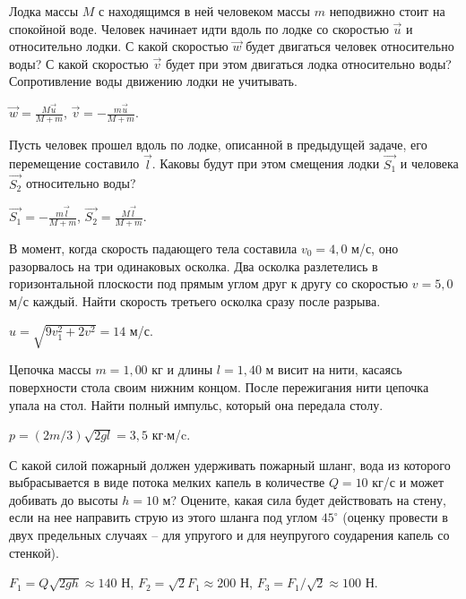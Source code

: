 \begin{ex} %
Лодка массы $M$ с находящимся в ней человеком массы $m$ неподвижно стоит на спокойной воде. Человек начинает идти вдоль по лодке со скоростью $\vec{u}$ и относительно лодки. С какой скоростью $\vec{w}$ будет двигаться человек относительно воды? С какой скоростью $\vec{v}$ будет при этом двигаться лодка относительно воды? Сопротивление воды движению лодки не учитывать.
\begin{ans}
$\vec{w} = \frac{M\vec{u}}{M+m}$, $\vec{v} = -\frac{m\vec{u}}{M+m}$.
\end{ans}
\end{ex}

\begin{ex} %
Пусть человек прошел вдоль по лодке, описанной в предыдущей задаче, его перемещение составило $\vec{l}$. Каковы будут при этом смещения лодки $\vec{S_1}$ и человека $\vec{S_2}$ относительно воды?
\begin{ans}
$\vec{S_1} = -\frac{m\vec{l}}{M+m}$, $\vec{S_2} = \frac{M\vec{l}}{M+m}$.
\end{ans}
\end{ex}

\complexProblems

\begin{ex} %
В момент, когда скорость падающего тела составила $v_0 = 4,0$ м/с, оно разорвалось на три одинаковых осколка. Два осколка разлетелись в горизонтальной плоскости под прямым углом друг к другу со скоростью $v = 5,0$ м/с каждый. Найти скорость третьего осколка сразу после разрыва.
\begin{ans}
$u = \sqrt{9v_{1}^2 + 2v^2} = 14$ м/с.
\end{ans}
\end{ex}

\begin{ex} %
Цепочка массы $m = 1,00$ кг и длины $l = 1,40$ м висит на нити, касаясь поверхности стола своим нижним концом. После пережигания нити цепочка упала на стол. Найти полный импульс, который она передала столу.
\begin{ans}
$p = (2m/3)\sqrt{2gl} = 3,5$ кг$\cdot$м/c.
\end{ans}
\end{ex}

\begin{ex} %
С какой силой пожарный должен удерживать пожарный шланг, вода из которого выбрасывается в виде потока мелких капель в количестве $Q = 10$ кг/с и может добивать до высоты $h = 10$ м? Оцените, какая сила будет действовать на стену, если на нее направить струю из этого шланга под углом $45^{\circ}$ (оценку провести в двух предельных случаях -- для упругого и для неупругого соударения капель со стенкой).
\begin{ans}
$F_1 = Q\sqrt{2gh} \approx 140$ Н, $F_2 = \sqrt{2} F_1 \approx 200$ Н, $F_3 = F_1/\sqrt{2} \approx 100$ Н. 
\end{ans}
\end{ex}

\clearpage